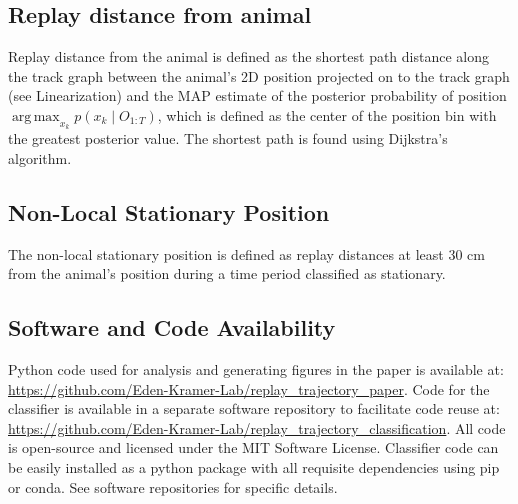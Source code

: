 \documentclass[times, twoside]{zHenriquesLab-StyleBioRxiv}
\DeclareMathOperator*{\argmax}{arg\,max}
\begin{document}
\subsection*{Replay distance from animal}
Replay distance from the animal is defined as the shortest path distance along the track graph between the animal's 2D position projected on to the track graph (see Linearization) and the MAP estimate of the posterior probability of position $\argmax_{x_k} p(x_{k} \mid O_{1:T})$, which is defined as the center of the position bin with the greatest posterior value. The shortest path is found using Dijkstra's algorithm.

\subsection*{Non-Local Stationary Position}
The non-local stationary position is defined as replay distances at least 30 cm from the animal's position during a time period classified as stationary.

\subsection*{Software and Code Availability}
Python code used for analysis and generating figures in the paper is available at: \url{https://github.com/Eden-Kramer-Lab/replay_trajectory_paper}. Code for the classifier is available in a separate software repository to facilitate code reuse at: \url{https://github.com/Eden-Kramer-Lab/replay_trajectory_classification}. All code is open-source and licensed under the MIT Software License. Classifier code can be easily installed as a python package with all requisite dependencies using pip or conda. See software repositories for specific details.

\newpage

\beginsupplement
\captionsetup*{format=largeformat}
\end{document}
